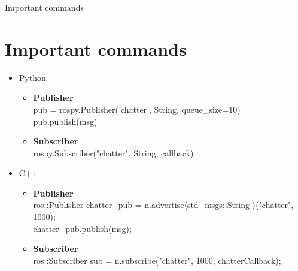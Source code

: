 \documentclass{beamer}
\begin{document}
\begin{frame}[fragile]{Important commands}
\section{Important commands}
\begin{itemize}
	\item {Python\\
	\begin{itemize}
		\item{\textbf{Publisher}}\\
		\footnotesize{pub = rospy.Publisher('chatter', String, queue\_size=10)}	\\
		\footnotesize{pub.publish(msg)}	\\
		
		\item{\textbf{Subscriber}}\\
		\footnotesize{rospy.Subscriber("chatter", String, callback)}	
	\end{itemize}
	}

	\item {C++ \\	
	\begin{itemize}
		\item{\textbf{Publisher}}\\
		\footnotesize{ros::Publisher chatter\_pub = n.advertise$\langle$std\_msgs::String $\rangle$("chatter", 1000);}	\\
		\footnotesize{chatter\_pub.publish(msg);}
		
		\item{\textbf{Subscriber}}\\
		\footnotesize{ros::Subscriber sub = n.subscribe("chatter", 1000, chatterCallback);}	
	\end{itemize}
}
\end{itemize}
\end{frame}	
\end{document}

